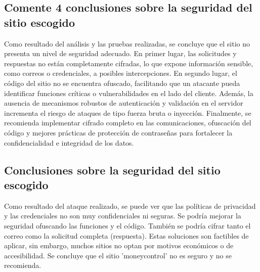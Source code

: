 \documentclass[letter,12pt]{article}
\begin{document}
\subsection{Comente 4 conclusiones sobre la seguridad del sitio escogido}
Como resultado del análisis y las pruebas realizadas, se concluye que el sitio no presenta un nivel de seguridad adecuado. En primer lugar, las solicitudes y respuestas no están completamente cifradas, lo que expone información sensible, como correos o credenciales, a posibles intercepciones. En segundo lugar, el código del sitio no se encuentra ofuscado, facilitando que un atacante pueda identificar funciones críticas o vulnerabilidades en el lado del cliente. Además, la ausencia de mecanismos robustos de autenticación y validación en el servidor incrementa el riesgo de ataques de tipo fuerza bruta o inyección. Finalmente, se recomienda implementar cifrado completo en las comunicaciones, ofuscación del código y mejores prácticas de protección de contraseñas para fortalecer la confidencialidad e integridad de los datos.

\subsection{Conclusiones sobre la seguridad del sitio escogido}
Como resultado del ataque realizado, se puede ver que las políticas de privacidad y las credenciales no son muy confidenciales ni seguras. Se podría mejorar la seguridad ofuscando las funciones y el código. También se podría cifrar tanto el correo como la solicitud completa (respuesta). Estas soluciones son factibles de aplicar, sin embargo, muchos sitios no optan por motivos económicos o de accesibilidad. Se concluye que el sitio 'moneycontrol' no es seguro y no se recomienda.
\end{document}
